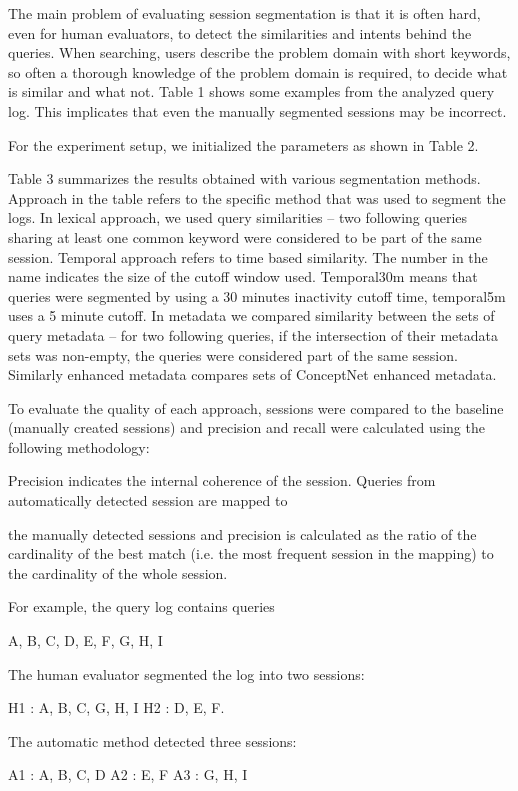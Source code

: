 \documentclass{acm_proc_article-sp} %
\begin{document}
The main problem of evaluating session segmentation is that
it is often hard, even for human evaluators, to detect the
similarities and intents behind the queries. When searching,
users describe the problem domain with short keywords, so
often a thorough knowledge of the problem domain is required,
to decide what is similar and what not. Table 1
shows some examples from the analyzed query log. This implicates
that even the manually segmented sessions may be
incorrect.

For the experiment setup, we initialized the parameters as
shown in Table 2.

Table 3 summarizes the results obtained with various segmentation
methods. Approach in the table refers to the specific
method that was used to segment the logs. In lexical
approach, we used query similarities – two following queries
sharing at least one common keyword were considered to be
part of the same session. Temporal approach refers to time
based similarity. The number in the name indicates the size
of the cutoff window used. Temporal30m means that queries
were segmented by using a 30 minutes inactivity cutoff time,
temporal5m uses a 5 minute cutoff. In metadata we compared
similarity between the sets of query metadata – for
two following queries, if the intersection of their metadata
sets was non-empty, the queries were considered part of the
same session. Similarly enhanced metadata compares sets of
ConceptNet enhanced metadata.

To evaluate the quality of each approach, sessions were compared
to the baseline (manually created sessions) and precision
and recall were calculated using the following methodology:

Precision indicates the internal coherence of the session.
Queries from automatically detected session are mapped to

the manually detected sessions and precision is calculated as
the ratio of the cardinality of the best match (i.e. the most
frequent session in the mapping) to the cardinality of the
whole session.

For example, the query log contains queries

{A, B, C, D, E, F, G, H, I}

The human evaluator segmented the log into two sessions:

H1 : {A, B, C, G, H, I}
H2 : {D, E, F}.

The automatic method detected three sessions:

A1 : {A, B, C, D}
A2 : {E, F}
A3 : {G, H, I}
\end{document}
